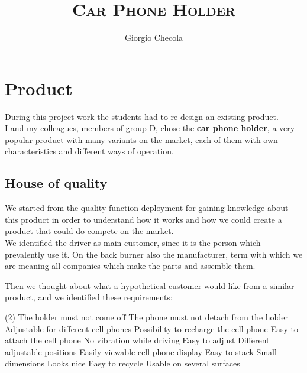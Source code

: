 \documentclass[11pt,a4paper]{article}
\title{\textsc{Car Phone Holder}}
\author{Giorgio Checola}
\begin{document}
\graphicspath{ {./images/} }
\maketitle
\thispagestyle{empty}
\newpage
\thispagestyle{empty}
\mbox{}
\hypersetup{linkcolor = black}
\tableofcontents

\newpage
\pagestyle{fancy}
\fancyhf{}
\fancyhead[LE,RO]{\leftmark}
\fancyhead[RE,LO]{\thepage}
\fancyfoot[LE,RO]{\rightmark}
\renewcommand{\headrulewidth}{2pt}
\renewcommand{\footrulewidth}{1pt}

\section{Product}
	During this project-work the students had to re-design an existing product. \\ 
	I and my colleagues, members of group D, chose the \textbf{car phone holder}, a very popular product with many variants on the market, each of them with own characteristics and different ways of operation.
	 
	\subsection{House of quality}
	We started from the quality function deployment for gaining knowledge about this product in order to understand how it works and how we could create a product that could do compete on the market. \\
	We identified the driver as main customer, since it is the person which prevalently use it. On the back burner also the manufacturer, term with which we are meaning all companies which make the parts and assemble them.
	
	\smallskip
	
	Then we thought about what a hypothetical customer would like from a similar product, and we identified these requirements:
	
	\begin{tasks}(2)
		\task[$\circ$] The holder must not come off
		\task[$\circ$] The phone must not detach from the holder
		\task[$\circ$] Adjustable for different cell phones
		\task[$\circ$] Possibility to recharge the cell phone
		\task[$\circ$] Easy to attach the cell phone
		\task[$\circ$] No vibration while driving
		\task[$\circ$] Easy to adjust
		\task[$\circ$] Different adjustable positions
		\task[$\circ$] Easily viewable cell phone display
		\task[$\circ$] Easy to stack
		\task[$\circ$] Small dimensions
		\task[$\circ$] Looks nice
		\task[$\circ$] Easy to recycle
		\task[$\circ$] Usable on several surfaces
	\end{tasks} 
	  
\end{document}
